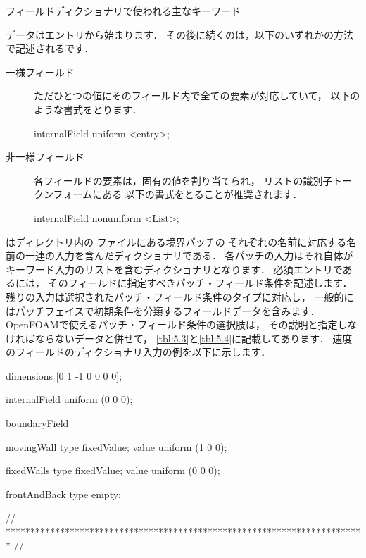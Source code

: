 \begin{table}[ht]
 
 \caption{フィールドディクショナリで使われる主なキーワード}
 \label{tbl:4.3}
\end{table}


データはエントリから始まります．
その後に続くのは，以下のいずれかの方法で記述されるです．
\begin{description}
 \item[一様フィールド]
            ただひとつの値にそのフィールド内で全ての要素が対応していて，
            以下のような書式をとります．
\begin{OFverbatim}[file]
internalField uniform <entry>;
\end{OFverbatim}
 \item[非一様フィールド]
            各フィールドの要素は，固有の値を割り当てられ，
            リストの識別子トークンフォームにある
            以下の書式をとることが推奨されます．
\begin{OFverbatim}[file]
internalField nonuniform <List>;
\end{OFverbatim}
\end{description}
はディレクトリ内の
ファイルにある境界パッチの
それぞれの名前に対応する名前の一連の入力を含んだディクショナリである．
各パッチの入力はそれ自体がキーワード入力のリストを含むディクショナリとなります．
必須エントリであるには，
そのフィールドに指定すべきパッチ・フィールド条件を記述します．
残りの入力は選択されたパッチ・フィールド条件のタイプに対応し，
一般的にはパッチフェイスで初期条件を分類するフィールドデータを含みます．
OpenFOAMで使えるパッチ・フィールド条件の選択肢は，
その説明と指定しなければならないデータと併せて，
\autoref{tbl:5.3}と\autoref{tbl:5.4}に記載してあります．
速度のフィールドのディクショナリ入力の例を以下に示します．
\begin{OFverbatim}[file, linenum=17]
dimensions      [0 1 -1 0 0 0 0];

internalField   uniform (0 0 0);

boundaryField
{
    movingWall
    {
        type            fixedValue;
        value           uniform (1 0 0);
    }

    fixedWalls
    {
        type            fixedValue;
        value           uniform (0 0 0);
    }

    frontAndBack
    {
        type            empty;
    }
}

// ************************************************************************* //
\end{OFverbatim}


